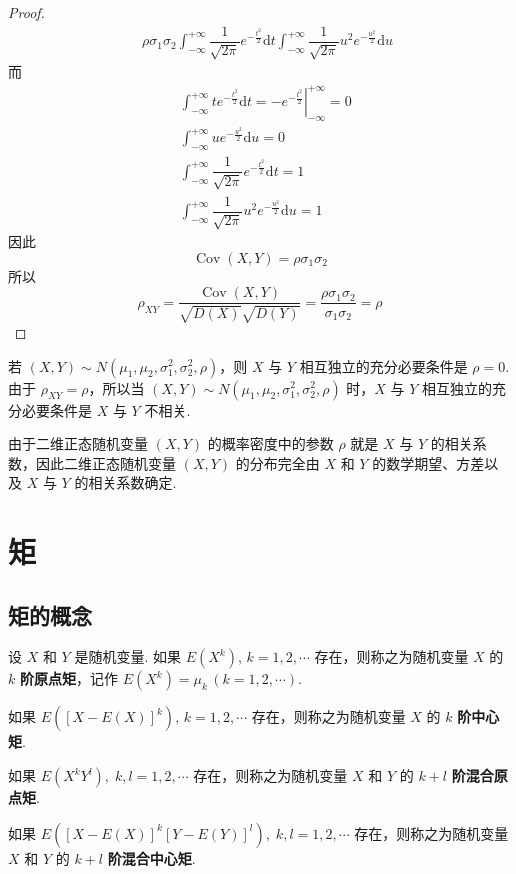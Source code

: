 \begin{proof}
$$\begin{aligned}
        & \; \rho \sigma_1 \sigma_2 \int_{-\infty}^{+\infty} \dfrac{1}{\sqrt{2 \pi}} e^{-\frac{t^2}{2}} \text{d}t \int_{-\infty}^{+\infty} \dfrac{1}{\sqrt{2 \pi}} u^2 e^{-\frac{u^2}{2}} \text{d}u
    \end{aligned}
    $$
    而
    $$
    \begin{aligned}
        & \int_{-\infty}^{+\infty} t e^{-\frac{t^2}{2}} \text{d}t = \left. -e^{-\frac{t^2}{2}} \right|_{-\infty}^{+\infty} = 0 \\
        & \int_{-\infty}^{+\infty} u e^{-\frac{u^2}{2}} \text{d}u = 0 \\
        & \int_{-\infty}^{+\infty} \dfrac{1}{\sqrt{2 \pi}} e^{-\frac{t^2}{2}} \text{d}t = 1 \\
        & \int_{-\infty}^{+\infty} \dfrac{1}{\sqrt{2 \pi}} u^2 e^{-\frac{u^2}{2}} \text{d}u = 1
    \end{aligned}
    $$
    因此
    $$
    \operatorname{Cov}(X,Y) = \rho \sigma_1 \sigma_2
    $$
    所以
    $$
    \rho_{XY} = \dfrac{\operatorname{Cov}(X,Y)}{\sqrt{D(X)} \sqrt{D(Y)}} = \dfrac{\rho \sigma_1 \sigma_2}{\sigma_1 \sigma_2} = \rho
    $$
\end{proof}

若 $(X,Y) \sim N(\mu_1,\mu_2,\sigma_1^2,\sigma_2^2,\rho)$，则 $X$ 与 $Y$ 相互独立的充分必要条件是 $\rho=0$. 由于 $\rho_{XY} = \rho$，所以当 $(X,Y) \sim N(\mu_1,\mu_2,\sigma_1^2,\sigma_2^2,\rho)$ 时，$X$ 与 $Y$ 相互独立的充分必要条件是 $X$ 与 $Y$ 不相关.

由于二维正态随机变量 $(X,Y)$ 的概率密度中的参数 $\rho$ 就是 $X$ 与 $Y$ 的相关系数，因此二维正态随机变量 $(X,Y)$ 的分布完全由 $X$ 和 $Y$ 的数学期望、方差以及 $X$ 与 $Y$ 的相关系数确定.

\section{矩}

\subsection{矩的概念}

\begin{definition}
    设 $X$ 和 $Y$ 是随机变量. 如果 $E(X^k), \, k=1,2,\cdots$ 存在，则称之为随机变量 $X$ 的 $k$ \textbf{阶原点矩}，记作 $E(X^k) = \mu_k \, (k=1,2,\cdots)$.

    如果 $E([X-E(X)]^k), \, k=1,2,\cdots$ 存在，则称之为随机变量 $X$ 的 $k$ \textbf{阶中心矩}.

    如果 $E(X^k Y^l), \; k,l=1,2,\cdots$ 存在，则称之为随机变量 $X$ 和 $Y$ 的 $k+l$ \textbf{阶混合原点矩}.

    如果 $E([X-E(X)]^k [Y-E(Y)]^l), \; k,l=1,2,\cdots$ 存在，则称之为随机变量 $X$ 和 $Y$ 的 $k+l$ \textbf{阶混合中心矩}.
\end{definition}

